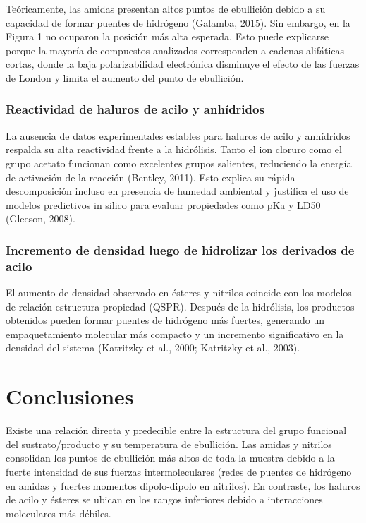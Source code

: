 \documentclass{article}
\begin{document}
Teóricamente, las amidas presentan altos puntos de ebullición debido a su capacidad de formar puentes de hidrógeno (Galamba, 2015). Sin embargo, en la Figura 1 no ocuparon la posición más alta esperada. Esto puede explicarse porque la mayoría de compuestos analizados corresponden a cadenas alifáticas cortas, donde la baja polarizabilidad electrónica disminuye el efecto de las fuerzas de London y limita el aumento del punto de ebullición.

\subsubsection{Reactividad de haluros de acilo y anhídridos}
La ausencia de datos experimentales estables para haluros de acilo y anhídridos respalda su alta reactividad frente a la hidrólisis. Tanto el ion cloruro como el grupo acetato funcionan como excelentes grupos salientes, reduciendo la energía de activación de la reacción (Bentley, 2011). Esto explica su rápida descomposición incluso en presencia de humedad ambiental y justifica el uso de modelos predictivos in silico para evaluar propiedades como pKa y LD50 (Gleeson, 2008).

\subsubsection{Incremento de densidad luego de hidrolizar los derivados de acilo}
El aumento de densidad observado en ésteres y nitrilos coincide con los modelos de relación estructura-propiedad (QSPR). Después de la hidrólisis, los productos obtenidos pueden formar puentes de hidrógeno más fuertes, generando un empaquetamiento molecular más compacto y un incremento significativo en la densidad del sistema (Katritzky et al., 2000; Katritzky et al., 2003).

\section{Conclusiones}
Existe una relación directa y predecible entre la estructura del grupo funcional del sustrato/producto y su temperatura de ebullición. Las amidas y nitrilos consolidan los puntos de ebullición más altos de toda la muestra debido a la fuerte intensidad de sus fuerzas intermoleculares (redes de puentes de hidrógeno en amidas y fuertes momentos dipolo-dipolo en nitrilos). En contraste, los haluros de acilo y ésteres se ubican en los rangos inferiores debido a interacciones moleculares más débiles.
\end{document}
